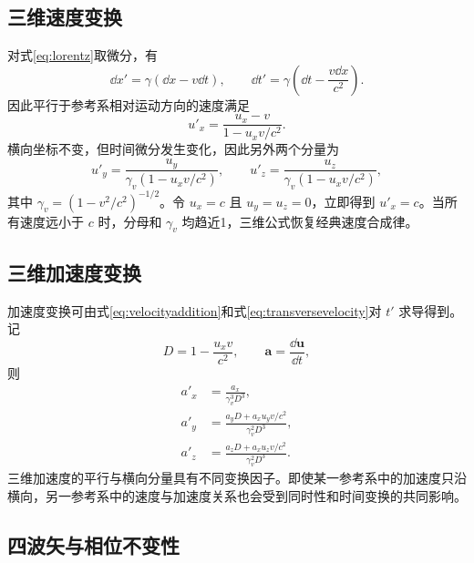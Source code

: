 \documentclass[style=classic,color=full]{lc-article}
\begin{document}
\subsection{三维速度变换}

对式\eqref{eq:lorentz}取微分，有
\begin{equation}
  \dd x'=\gamma(\dd x-v\dd t),\qquad
  \dd t'=\gamma\left(\dd t-\frac{v\dd x}{c^2}\right).
\end{equation}
因此平行于参考系相对运动方向的速度满足
\begin{equation}
  \boxed{u'_x=\frac{u_x-v}{1-u_xv/c^2}.}
  \label{eq:velocityaddition}
\end{equation}
横向坐标不变，但时间微分发生变化，因此另外两个分量为
\begin{equation}
  \boxed{
  u'_y=\frac{u_y}{\gamma_v(1-u_xv/c^2)},
  \qquad
  u'_z=\frac{u_z}{\gamma_v(1-u_xv/c^2)},}
  \label{eq:transversevelocity}
\end{equation}
其中 $\gamma_v=(1-v^2/c^2)^{-1/2}$。令 $u_x=c$ 且 $u_y=u_z=0$，立即得到 $u'_x=c$。当所有速度远小于 $c$ 时，分母和 $\gamma_v$ 均趋近1，三维公式恢复经典速度合成律。

\subsection{三维加速度变换}

加速度变换可由式\eqref{eq:velocityaddition}和式\eqref{eq:transversevelocity}对 $t'$ 求导得到。记
\begin{equation*}
  D=1-\frac{u_xv}{c^2},
  \qquad
  \bm a=\frac{\dd\bm u}{\dd t},
\end{equation*}
则
\begin{equation}
  \boxed{
  \begin{aligned}
    a'_x&=\frac{a_x}{\gamma_v^3D^3},\\
    a'_y&=\frac{a_yD+a_xu_yv/c^2}
      {\gamma_v^2D^3},\\
    a'_z&=\frac{a_zD+a_xu_zv/c^2}
      {\gamma_v^2D^3}.
  \end{aligned}}
  \label{eq:accelerationtransformation}
\end{equation}
三维加速度的平行与横向分量具有不同变换因子。即使某一参考系中的加速度只沿横向，另一参考系中的速度与加速度关系也会受到同时性和时间变换的共同影响。

\subsection{四波矢与相位不变性}
\end{document}
